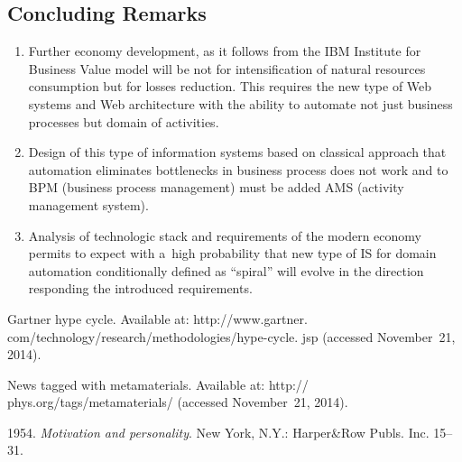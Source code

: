 \begin{multicols}{2}
\vspace*{-6pt}

\section{Concluding Remarks}

\vspace*{-2pt}

\noindent
\begin{enumerate}
 \item  Further economy development, as it follows from the IBM Institute for Business Value model will
be not for intensification of natural resources consumption but for losses reduction. This requires the new
type of Web systems and Web architecture with the ability to automate not just business processes but
domain of activities.\\[-14pt]
 \item Design of this type of information systems based on classical approach that automation eliminates
bottlenecks in business process does not work and to BPM (business process management) must be added
AMS (activity management system).\\[-14pt]
 \item Analysis of technologic stack and requirements of the modern economy permits
 to expect with
a~high probability that new type of IS
for domain automation conditionally defined as
``spiral'' will evolve in the direction responding the introduced requirements.
 \end{enumerate}

\renewcommand{\bibname}{\protect\rmfamily References}

\vspace*{-6pt}

{\small\frenchspacing
{%
\begin{thebibliography}{99}

\vspace*{-2pt}

Gartner hype cycle. Available at: {\sf http://www.gartner.\linebreak
com/technology/research/methodologies/hype-cycle. jsp}
(accessed November~21, 2014).

News tagged with metamaterials. Available at:
{\sf http:// phys.org/tags/metamaterials/} (accessed November~21, 2014).

 1954. \textit{Motivation and personality}. New York, N.Y.: Harper\&Row Publs.
Inc. 15--31.


\end{thebibliography}}}
\end{multicols}
